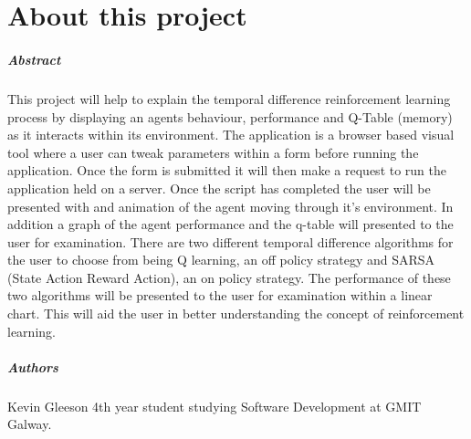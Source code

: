 
\chapter*{About this project}
\paragraph{Abstract}

This project will help to explain the temporal difference reinforcement learning process by displaying an agents behaviour, performance and Q-Table (memory) as it interacts within its environment. The application is a browser based visual tool where a user can tweak parameters within a form before running the application. Once the form is submitted it will then make a request to run the application held on a server. Once the script has completed the user will be presented with and animation of the agent moving through it's environment. In addition a graph of the agent performance and the q-table will presented to the user for examination. There are two different temporal difference algorithms for the user to choose from being Q learning, an off policy strategy and SARSA (State Action Reward Action), an on policy strategy. The performance of these two algorithms will be presented to the user for examination within a linear chart.
This will aid the user in better understanding the concept of reinforcement learning.

\paragraph{Authors}
Kevin Gleeson 4th year student studying Software Development at GMIT Galway.



